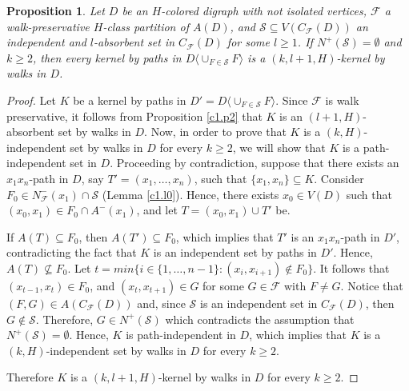 \documentclass[10pt,a4paper]{article}
\newtheorem{prop}[theorem]{Proposition}
\begin{document}
\begin{prop}
\label{emptyoutneighborhood}
Let $D$ be an $H$-colored digraph with not isolated vertices, $\mathscr{F}$ a walk-preservative $H$-class partition of $A(D)$, and $\mathcal{S}\subseteq V(C_{\mathscr{F}}(D))$ an independent and $l$-absorbent set in $C_{\mathscr{F}}(D)$ for some $l \geq 1$. If $N^{+}(\mathcal{S}) = \emptyset$ and $k \geq 2$, then every kernel by paths in $D\langle \cup_{F\in \mathcal{S}} F \rangle$ is a $(k,l+1,H)$-kernel by walks in $D$.
\end{prop}
\begin{proof}
Let $K$ be a kernel by paths in $D'=D\langle \cup _{F\in \mathcal{S}} F \rangle$. Since $\mathscr{F}$ is walk preservative, it follows from  Proposition \ref{c1.p2} that $K$ is an $(l+1,H)$-absorbent set by walks in $D$. Now, in order to prove that $K$ is a $(k,H)$-independent set by walks in $D$ for every $k \geq 2$, we will show that $K$ is a path-independent set in $D$. Proceeding by contradiction, suppose that there exists an $x_{1}x_{n}$-path in $D$, say $T'=(x_{1}, \ldots , x_{n})$, such that $\{ x_{1}, x_{n} \} \subseteq K$. Consider $F_{0} \in N^{-}_{\mathscr{F}}(x_{1})\cap \mathcal{S}$ (Lemma \ref{c1.l0}). Hence, there exists $x_{0} \in V(D)$ such that $(x_{0}, x_{1}) \in F_{0} \cap A^{-}(x_{1})$, and let $T=(x_{0}, x_{1}) \cup T'$ be.

If $A(T) \subseteq F_{0}$, then $A(T') \subseteq F_{0}$, which implies that $T'$ is an $x_{1}x_{n}$-path in $D'$, contradicting the fact that $K$ is an independent set by paths in $D'$. Hence, $A(T)\not \subseteq F_{0}$. Let $t = min \{ i \in \{ 1, \ldots , n-1 \} : (x_{i}, x_{i+1}) \notin F_{0} \}$. It follows that $(x_{t-1}, x_{t}) \in F_{0}$, and $(x_{t}, x_{t+1}) \in G$ for some $G \in \mathscr{F}$ with $F\neq G$. Notice that $(F,G) \in A(C_{\mathscr{F}}(D))$ and, since $\mathcal{S}$ is an independent set in $C_{\mathscr{F}}(D)$, then $G \notin \mathcal{S}$. Therefore, $G \in N^{+}(\mathcal{S})$ which contradicts the assumption that $N^{+}(\mathcal{S})=\emptyset$. Hence, $K$ is path-independent in $D$, which implies that $K$ is a $(k,H)$-independent set by walks in $D$ for every $k \geq 2$.

Therefore $K$ is a $(k,l+1,H)$-kernel by walks in $D$ for every $k \geq 2$.
\end{proof}
\end{document}
